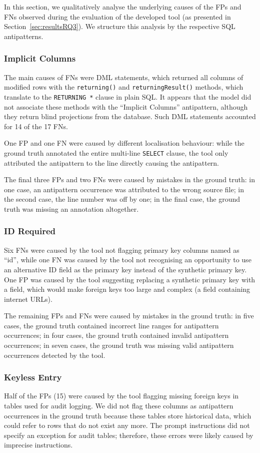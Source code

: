 In this section, we qualitatively analyse the underlying causes of the FPs and FNs observed during the evaluation of the developed tool (as presented in Section~\ref{sec:resultsRQ3}). We structure this analysis by the respective SQL antipatterns.

\subsubsection*{Implicit Columns}
The main causes of FNs were DML statements, which returned all columns of modified rows with the \texttt{returning()} and \texttt{returningResult()} methods, which translate to the \texttt{RETURNING *} clause in plain SQL. It appears that the model did not associate these methods with the “Implicit Columns” antipattern, although they return blind projections from the database. Such DML statements accounted for \num{14} of the \num{17} FNs.

One FP and one FN were caused by different localisation behaviour: while the ground truth annotated the entire multi-line \texttt{SELECT} clause, the tool only attributed the antipattern to the line directly causing the antipattern.

The final three FPs and two FNs were caused by mistakes in the ground truth: in one case, an antipattern occurrence was attributed to the wrong source file; in the second case, the line number was off by one; in the final case, the ground truth was missing an annotation altogether.

\subsubsection*{ID Required}
Six FNs were caused by the tool not flagging primary key columns named as “id”, while one FN was caused by the tool not recognising an opportunity to use an alternative ID field as the primary key instead of the synthetic primary key. One FP was caused by the tool suggesting replacing a synthetic primary key with a field, which would make foreign keys too large and complex (a field containing internet URLs).

The remaining FPs and FNs were caused by mistakes in the ground truth: in five cases, the ground truth contained incorrect line ranges for antipattern occurrences; in four cases, the ground truth contained invalid antipattern occurrences; in seven cases, the ground truth was missing valid antipattern occurrences detected by the tool.

\subsubsection*{Keyless Entry}
Half of the FPs (15) were caused by the tool flagging missing foreign keys in tables used for audit logging. We did not flag these columns as antipattern occurrences in the ground truth because these tables store historical data, which could refer to rows that do not exist any more. The prompt instructions did not specify an exception for audit tables; therefore, these errors were likely caused by imprecise instructions.

